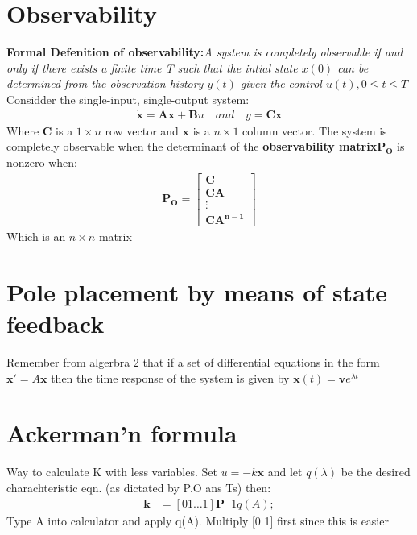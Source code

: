 \documentclass{report}
\begin{document}

	\section{Observability}

\label{sub:observability}
{\bf Formal Defenition of observability:}\emph{A system is completely observable if and only if there exists a finite time T such that the intial state $x(0)$ can be determined from the observation history $y(t)$ given the control $u(t), 0 \leq t \leq T$}\\
Considder the single-input, single-output system:
\begin{align*}
\mathbf{\dot{x} = Ax +B}u \quad and \quad y = \mathbf{Cx}	
\end{align*}
Where $\mathbf{C}$ is a $1 \times n$ row vector and $\mathbf{x}$ is a $n \times 1$ column vector. The system is completely observable when the determinant of the {\bf observability matrix$\mathbf{P_O}$} is nonzero when:
\begin{align*}
\mathbf{P_O} = \left[ 	\begin{matrix}
 		\mathbf{C}\\\mathbf{CA}\\ \vdots \\\mathbf{CA^{n-1}}
 	\end{matrix}
 	\right]
 \end{align*} 
 Which is an $n \times n$ matrix




	\section{Pole placement by means of state feedback}
\label{sub:pole_placement}
Remember from algerbra 2 that if a set of differential equations in the form $\mathbf{x'} = A\mathbf{x}$ then the time response of the system is given by $\mathbf{x}(t) = \mathbf{v}e^{\lambda t}$
	\section{Ackerman'n formula}

\label{sub:ackerman_s_equation}

Way to calculate K with less variables. Set $u = -k\mathbf{x}$ and let $q(\lambda)$ be the desired charachteristic eqn. (as dictated by P.O ans Ts) then:
\begin{align*}
	\mathbf{k} &= [0 1 \dots 1]\mathbf{P}^-1q(A);
\end{align*}
Type A into calculator and apply q(A). Multiply [0 1] first since this is easier
\end{document}
